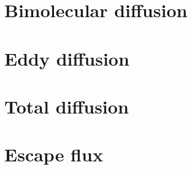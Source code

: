 \hfil%

\section[Titan_code_mol_diff]{Bimolecular diffusion}


\section[Titan_code_eddy]{Eddy diffusion}


\section[Titan_code_tot_diff]{Total diffusion}


\section{Escape flux}

